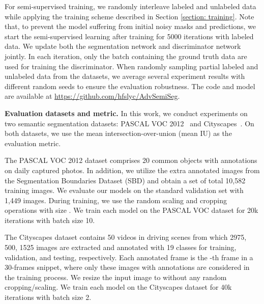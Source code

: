 \documentclass{bmvc2k}
\begin{document}
For semi-supervised training, we randomly interleave labeled and unlabeled data while applying the training scheme described in Section \ref{section: training}.
Note that, to prevent the model suffering from initial noisy masks and predictions, we start the semi-supervised learning after training for 5000 iterations with labeled data.
We update both the segmentation network and discriminator network jointly. In each iteration, only the batch containing the ground truth data are used for training the discriminator.
When randomly sampling partial labeled and unlabeled data from the datasets, we average several experiment results with different random seeds to ensure the evaluation robustness.
The code and model are available at \url{https://github.com/hfslyc/AdvSemiSeg}.
	
	\vspace{-2mm}		
	{\flushleft \bf Evaluation datasets and metric.}
In this work, we conduct experiments on two semantic segmentation datasets: PASCAL VOC 2012~\cite{pascal} and Cityscapes~\cite{cityscapes}. 
On both datasets, we use the mean intersection-over-union (mean IU) as the evaluation metric.
	
	The PASCAL VOC 2012 dataset comprises 20 common objects with annotations on daily captured photos.
In addition, we utilize the extra annotated images from the Segmentation Boundaries Dataset (SBD) \cite{sbd} and obtain a set of total 10,582 training images. 
We evaluate our models on the standard validation set with 1,449 images.
During training, we use the random scaling and cropping operations with size .
We train each model on the PASCAL VOC dataset for 20k iterations with batch size 10.
	
	The Cityscapes dataset contains 50 videos in driving scenes from which 
	2975, 500, 1525 images are extracted and annotated with 19 classes for training, validation, and testing, respectively.
Each annotated frame is the -{th} frame in a 30-frames snippet, where only these images with annotations are considered in the training process.
We resize the input image to  without any random cropping/scaling.
We train each model on the Cityscapes dataset for 40k iterations with batch size 2.
	
\end{document}
